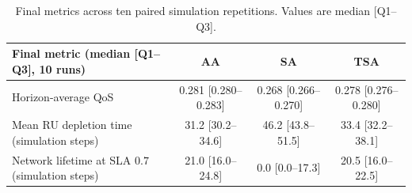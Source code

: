 \begin{table}[!t]
    \caption{Final metrics across ten paired simulation repetitions. Values are median [Q1--Q3].}
    \label{tab:simulation-results-summary}
    \centering
    \scriptsize
    \setlength{\tabcolsep}{3pt}
    \renewcommand{\arraystretch}{1.1}
    \begin{tabular}{p{} c c c}
        \hline
        \textbf{Final metric (median [Q1--Q3], 10 runs)} & \textbf{AA} & \textbf{SA} & \textbf{TSA} \\
        \hline
        Horizon-average QoS & 0.281 [0.280--0.283] & 0.268 [0.266--0.270] & 0.278 [0.276--0.280] \\
        Mean RU depletion time (simulation steps) & 31.2 [30.2--34.6] & 46.2 [43.8--51.5] & 33.4 [32.2--38.1] \\
        Network lifetime at SLA $0.7$ (simulation steps) & 21.0 [16.0--24.8] & 0.0 [0.0--17.3] & 20.5 [16.0--22.5] \\
        \hline
    \end{tabular}
\end{table}
